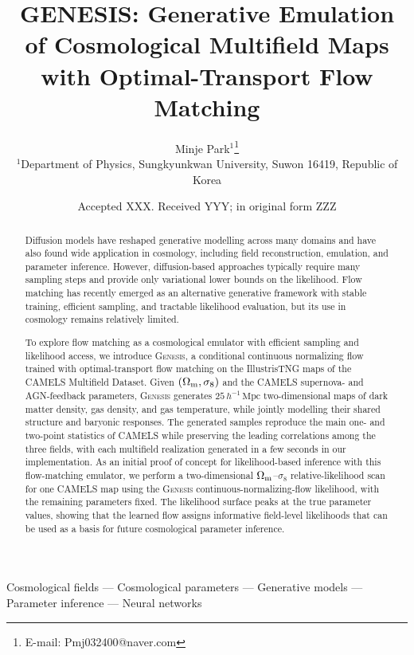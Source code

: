 \documentclass[usenatbib]{mnras}
\title[GENESIS: Flow-Based Cosmological Emulator]{
GENESIS: Generative Emulation of Cosmological Multifield Maps with
Optimal-Transport Flow Matching
}
\author[M. Park]{%
Minje Park$^{1}$\thanks{E-mail: Pmj032400@naver.com}
\\
$^{1}$Department of Physics, Sungkyunkwan University, Suwon 16419, Republic of Korea
}
\date{Accepted XXX. Received YYY; in original form ZZZ}
\newcommand{\Om}{\Omega_{\rm m}}
\newcommand{\sig}{\sigma_8}
\begin{document}
\label{firstpage}
\pagerange{\pageref{firstpage}--\pageref{lastpage}}
\maketitle

\begin{abstract}
Diffusion models have reshaped generative modelling across many
domains and have also found wide application in cosmology, including
field reconstruction, emulation, and parameter inference. However,
diffusion-based approaches typically require many sampling steps and
provide only variational lower bounds on the likelihood. Flow matching
has recently emerged as an alternative generative framework with stable
training, efficient sampling, and tractable likelihood evaluation, but
its use in cosmology remains relatively limited.

To explore flow matching as a cosmological emulator with efficient
sampling and likelihood access, we introduce \textsc{Genesis}, a
conditional continuous normalizing flow trained with optimal-transport
flow matching on the IllustrisTNG maps of the CAMELS Multifield
Dataset. Given $(\Om,\sig)$ and the CAMELS supernova- and
AGN-feedback parameters, \textsc{Genesis} generates
$25\,h^{-1}\,\mathrm{Mpc}$ two-dimensional maps of dark matter
density, gas density, and gas temperature, while jointly modelling
their shared structure and baryonic responses. The generated samples
reproduce the main one- and two-point statistics of CAMELS while
preserving the leading correlations among the three fields, with each
multifield realization generated in a few seconds in our
implementation.
As an initial proof of concept for likelihood-based inference with
this flow-matching emulator, we perform a two-dimensional
$\Om$--$\sig$ relative-likelihood scan for one CAMELS map using the
\textsc{Genesis} continuous-normalizing-flow likelihood, with the
remaining parameters fixed. The likelihood surface peaks at the true
parameter values, showing that the learned flow assigns informative
field-level likelihoods that can be used as a basis for future
cosmological parameter inference.
\end{abstract}

\begin{keywords}
Cosmological fields ---
Cosmological parameters ---
Generative models ---
Parameter inference ---
Neural networks
\end{keywords}
\end{document}
